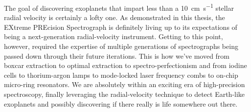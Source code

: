 The goal of discovering exoplanets that impart less than a 10~\si{\centi\meter\per\second} stellar radial velocity is certainly a lofty one. As demonstrated in this thesis, the EXtreme PREcision Spectrograph is definitely living up to its expectations of being a next-generation radial-velocity instrument. Getting to this point, however, required the expertise of multiple generations of spectrographs being passed down through their future iterations. This is how we've moved from boxcar extraction to optimal extraction to spectro-perfectionism and from iodine cells to thorium-argon lamps to mode-locked laser frequency combs to on-chip micro-ring resonators. We are absolutely within an exciting era of high-precision spectroscopy, finally leveraging the radial-velocity technique to detect Earth-like exoplanets and possibly discovering if there really is life somewhere out there.
